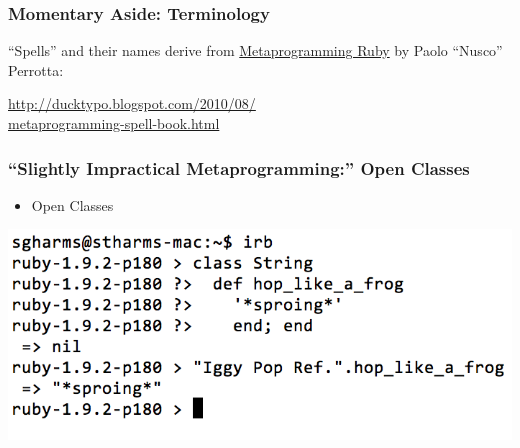 \documentclass[slidestop,compress,mathserif]{beamer}
\begin{document}
\begin{frame}
	\frametitle{Momentary Aside: Terminology}
	``Spells'' and their names derive from \underline{Metaprogramming Ruby} by Paolo ``Nusco'' Perrotta:
	\vskip 0.5cm
	\begin{center}
		\underline{http://ducktypo.blogspot.com/2010/08/} \\
		\underline{metaprogramming-spell-book.html}
	\end{center}
\end{frame}

\begin{frame}
	\frametitle{``Slightly Impractical Metaprogramming:''  Open Classes}
	\begin{itemize}
		\item Open Classes
	\end{itemize}
		\includegraphics[scale=0.42]{img/open_class.png}
\end{frame}
\end{document}
